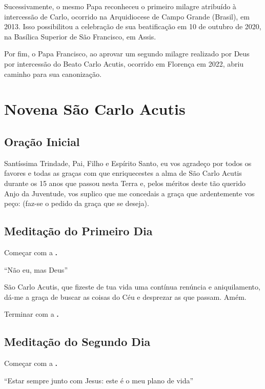 \documentclass[a4paper,14pt]{extarticle} \usepackage[utf8]{inputenc}
\begin{document}
Sucessivamente, o mesmo Papa reconheceu o primeiro milagre atribuído à intercessão de Carlo, ocorrido  na Arquidiocese de Campo Grande (Brasil), em 2013. Isso possibilitou a celebração de sua beatificação em 10 de outubro de 2020, na Basílica Superior de São Francisco, em Assis.

Por fim, o Papa Francisco, ao aprovar um segundo milagre realizado por Deus por intercessão do Beato Carlo Acutis, ocorrido em Florença em 2022, abriu caminho para sua canonização.


\newpage

\section{Novena São Carlo Acutis}

\subsection{Oração Inicial} \label{oracao-inicial}

Santíssima Trindade, Pai, Filho e Espírito Santo, eu vos agradeço por todos os favores e todas as graças com que enriquecestes a alma de São Carlo Acutis durante os 15 anos que passou nesta Terra e, pelos méritos deste tão querido Anjo da Juventude, vos suplico que me concedais a graça que ardentemente vos peço: (faz-se o pedido da graça que se deseja).

\subsection{Meditação do Primeiro Dia}

Começar com a \textbf{.}

“Não eu, mas Deus”

São Carlo Acutis, que fizeste de tua vida uma contínua renúncia e aniquilamento, dá-me a graça de buscar as coisas do Céu e desprezar as que passam. Amém.

Terminar com a \textbf{.}

\subsection{Meditação do Segundo Dia}

Começar com a \textbf{.}

“Estar sempre junto com Jesus: este é o meu plano de vida”
\end{document}
